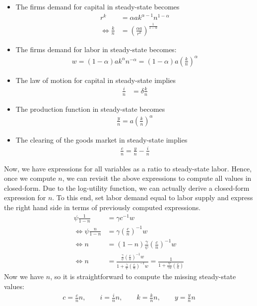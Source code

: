 \begin{enumerate}
\begin{itemize}

\item
The firms demand for capital in steady-state becomes
\begin{align*}
r^{k} &= \alpha a k^{\alpha-1} n^{1-\alpha}
\\
\Leftrightarrow \frac{k}{n} &= {\left(\frac{\alpha a}{r^{k}}\right)}^{\frac{1}{1-\alpha}}
\end{align*}

\item
The firms demand for labor in steady-state becomes:
\begin{align*}
w = (1-\alpha) a k^\alpha n^{-\alpha} = (1-\alpha)a {\left(\frac{k}{n}\right)}^\alpha
\end{align*}

\item
The law of motion for capital in steady-state implies
\begin{align*}
\frac{i}{n} &= \delta\frac{k}{n}
\end{align*}

\item
The production function in steady-state becomes
\begin{align*}
\frac{y}{n} = a {\left(\frac{k}{n}\right)}^\alpha
\end{align*}

\item The clearing of the goods market in steady-state implies 
\begin{align*}
\frac{c}{n} = \frac{y}{n} - \frac{i}{n}
\end{align*}

\end{itemize}

Now, we have expressions for all variables as a ratio to steady-state labor.
Hence, once we compute \(n\), we can revisit the above expressions to compute all values in closed-form.
Due to the log-utility function, we can actually derive a closed-form expression for \(n\).
To this end, set labor demand equal to labor supply and express the right hand side in terms of previously computed expressions.
\begin{align*}
\psi \frac{1}{1-n} &= \gamma c^{-1} w
\\
\Leftrightarrow \psi \frac{n}{1-n} &= \gamma {\left(\frac{c}{n}\right)}^{-1} w
\\
\Leftrightarrow n &= (1-n)\frac{\gamma}{\psi} {\left(\frac{c}{n}\right)}^{-1} w
\\
\Leftrightarrow n &= \frac{\frac{\gamma}{\psi} {\left(\frac{c}{n}\right)}^{-1} w}{1+\frac{\gamma}{\psi} {\left(\frac{c}{n}\right)}^{-1} w}
= \frac{1}{1+\frac{\psi}{\gamma w} {\left(\frac{c}{n}\right)}}
\end{align*}
Now we have \(n\), so it is straightforward to compute the missing steady-state values:
\begin{align*}
c = \frac{c}{n} n,\qquad
i = \frac{i}{n} n,\qquad
k = \frac{k}{n} n,\qquad	
y = \frac{y}{n} n
\end{align*}


\end{enumerate}
